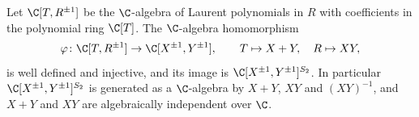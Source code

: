 Let $\C[T,R^{\pm1}]$ be the $\C$-algebra of Laurent polynomials in $R$ with coefficients in the polynomial ring
$\C[T]$. The $\C$-algebra homomorphism
\[
  \varphi\colon\C[T,R^{\pm1}]\to\C[X^{\pm1},Y^{\pm1}],\qquad T\mapsto X+Y,\quad R\mapsto XY,
\]
is well defined and injective, and its image is $\C[X^{\pm1},Y^{\pm1}]^{S_2}$. In particular
$\C[X^{\pm1},Y^{\pm1}]^{S_2}$ is generated as a $\C$-algebra by $X+Y$, $XY$ and $(XY)^{-1}$, and $X+Y$ and $XY$ are
algebraically independent over $\C$.
